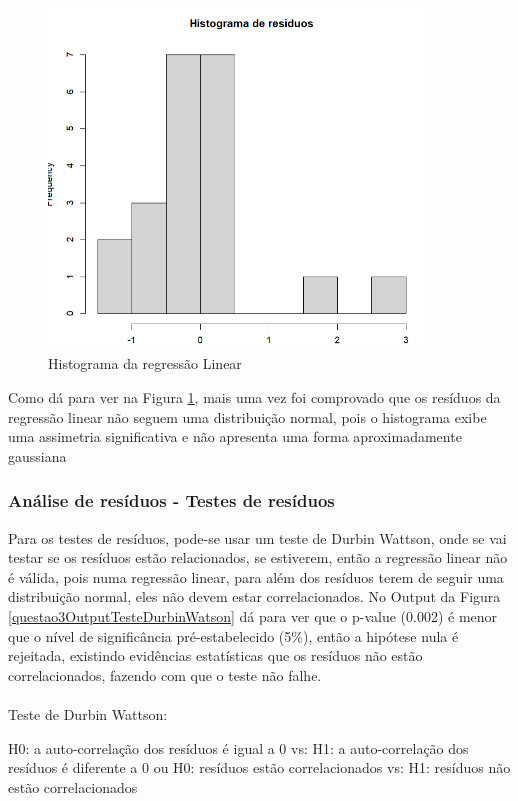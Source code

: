 \documentclass[%
 aip,
cp,  %
 amsmath,amssymb,%
 reprint,%
]{revtex4-2}
\begin{document}
\begin{figure}[!h]
    \centering
    \includegraphics[width=10cm]{imagens/questao3/questao3Histograma.png}
    \caption{Histograma da regressão Linear}
    \label{questao3Histograma}
\end{figure}


Como dá para ver na Figura \ref{questao3Histograma}, mais uma vez foi comprovado que os resíduos da regressão linear não seguem uma distribuição normal, pois o histograma exibe uma assimetria significativa e não apresenta uma forma aproximadamente gaussiana


\subsubsection{Análise de resíduos - Testes de resíduos}
Para os testes de resíduos, pode-se usar um teste de Durbin Wattson, onde se vai testar se os resíduos estão relacionados, se estiverem, então a regressão linear não é válida, pois numa regressão linear, para além dos resíduos terem de seguir uma distribuição normal, eles não devem estar correlacionados. No Output da Figura \ref{questao3OutputTesteDurbinWatson}  dá para ver que o p-value (0.002) é menor que o nível de significância pré-estabelecido (5\%), então a hipótese nula é rejeitada, existindo evidências estatísticas que os resíduos não estão correlacionados, fazendo com que o teste não falhe. \\ \\
Teste de Durbin Wattson:

\begin{center}
    H0: a auto-correlação dos resíduos é igual a 0 
    \newline
    vs:
    \newline
    H1: a auto-correlação dos resíduos é diferente a 0 
    \newline
    \newline
    ou
    \newline
    \newline
    H0:  resíduos estão correlacionados 
    \newline
    vs:
    \newline
    H1: resíduos não estão correlacionados
    \newline
\end{center}
\end{document}

